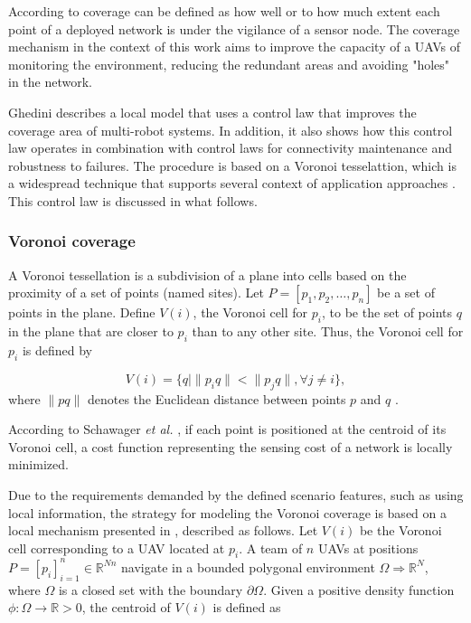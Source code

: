 
According to \cite{sangwan_2015} coverage can be defined as how well or to how much extent each point of a deployed network is under the vigilance of a sensor node. The coverage mechanism in the context of this work aims to improve the capacity of a UAVs of monitoring the environment, reducing the redundant areas and avoiding "holes" in the network. 

Ghedini \cite{ghedini_2017} describes a local model that uses a control law that improves the coverage area of multi-robot systems. In addition, it also shows how this control law operates in combination with control laws for connectivity maintenance and robustness to failures. The procedure is based on a Voronoi tesselattion, which is a widespread technique that supports several context of application approaches \cite{breitenmoser2010}. This control law is discussed in what follows.

\subsubsection{Voronoi coverage}

A Voronoi tessellation is a subdivision of a plane into cells based on the proximity of a set of points (named sites).
Let $P=\left[p_1,p_2, \ldots, p_n\right]$ be a set of points in the plane. Define $V(i)$, the Voronoi cell for $p_i$, to
be the set of points $q$ in the plane that are closer to $p_i$ than to any other site. Thus, the Voronoi cell for  $p_i$ is defined by 

\begin{equation} \label{eq:VoronoiDefinition}
V(i)=\{q \mid \|p_iq\| < \|p_jq\|, \forall j\neq i \}, 
\end{equation}
where  $\|pq\|$ denotes the Euclidean distance between points $p$ and $q$ \cite{mount_2002}.

According to Schawager \textit{et al.} \cite{schwager_2007}, if each point is positioned at the centroid of its Voronoi cell,  a cost function representing the sensing cost of a network is locally minimized.

Due to the requirements demanded by the defined scenario features, such as using local information, the strategy for modeling the Voronoi coverage is based on a local mechanism presented in \cite{breitenmoser2010}, described as follows. Let $V(i)$ be the Voronoi cell corresponding to a UAV located at $p_i$. A team of $n$ UAVs at positions $P= [p_i]_{i=1}^n\in\mathbb{R}^{Nn}$ navigate in a bounded polygonal environment $\Omega\Rightarrow\mathbb{R}^{N}$, where $\Omega$ is a closed set with the boundary $\partial\Omega$. 
Given  a positive density function $ \phi:\Omega\rightarrow\mathbb{R} >0$, the centroid of $V(i)$ is defined as


